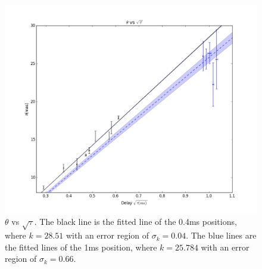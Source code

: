 \documentclass[useAMS,usenatbib]{mn2e}
\begin{document}

\begin{figure}
\centering
\includegraphics[width=1.0\textwidth, angle=0]{Theta_tau.png}
\caption{${\theta}$ vs ${\sqrt{\tau}}$. The black line is the fitted line of the 0.4ms positions, where $k=28.51$ with an error region of $\sigma_k=0.04$. The blue lines are the fitted lines of the 1ms position, where $k=25.784$ with an error region of $\sigma_k=0.66$.
}
\end{figure}
\end{document}
